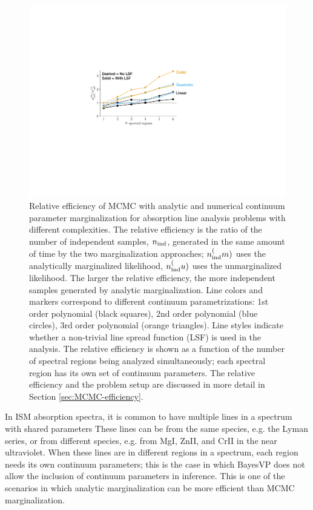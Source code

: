 \documentclass[manuscript]{aastex62}
\begin{document}
\begin{figure}
  \includegraphics{efficiency.pdf}
  \caption{
  Relative efficiency of MCMC with analytic and numerical continuum parameter marginalization for absorption line analysis problems with different complexities.
  The relative efficiency is the ratio of the number of independent samples, $n_{\rm ind}$, generated in the same amount of time by the two marginalization approaches; $n_{\rm ind}^(m)$ uses the analytically marginalized likelihood, $n_{\rm ind}^(u)$ uses the unmarginalized likelihood.
  The larger the relative efficiency, the more independent samples generated by analytic marginalization.
  Line colors and markers correspond to different continuum parametrizations: 1st order polynomial (black squares), 2nd order polynomial (blue circles), 3rd order polynomial (orange triangles).
  Line styles indicate whether a non-trivial line spread function (LSF) is used in the analysis.
  The relative efficiency is shown as a function of the number of spectral regions being analyzed simultaneously; each spectral region has its own set of continuum parameters.
  The relative efficiency and the problem setup are discussed in more detail in Section \ref{sec:MCMC-efficiency}.
  }
  \label{fig:efficiency-comparison}
\end{figure}

In ISM absorption spectra, it is common to have multiple lines in a spectrum with shared parameters
These lines can be from the same species, e.g. the Lyman series, or from different species, e.g. from Mg\small{I}, Zn\small{II}, and Cr\small{II} in the near ultraviolet.
When these lines are in different regions in a spectrum, each region needs its own continuum parameters; this is the case in which BayesVP does not allow the inclusion of continuum parameters in inference.
This is one of the scenarios in which analytic marginalization can be more efficient than MCMC marginalization.
\end{document}
